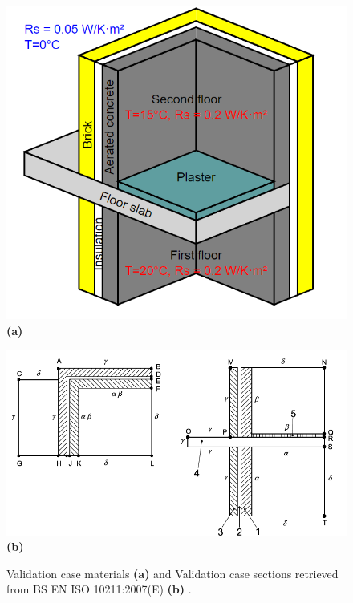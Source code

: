 \begin{figure}[H]
    \centering
    \begin{minipage}[t]{0.54\columnwidth}
        \centering
        \includegraphics[width=\linewidth]{Figures/validationcase}
        \textbf{(a)}
    \end{minipage}
    \hfill
    \begin{minipage}[t]{0.8\linewidth}
        \centering
        \includegraphics[width=\linewidth]{Figures/isodesc.png}
        \textbf{(b)}
    \end{minipage}
    
    \caption[3D Validation Materials]{Validation case materials \cite{ISO} \textbf{(a)} and Validation case sections retrieved from BS EN ISO 10211:2007(E) \textbf{(b)} \cite{ISO}.}
    \label{fig:validation-case-materials}
\end{figure}









